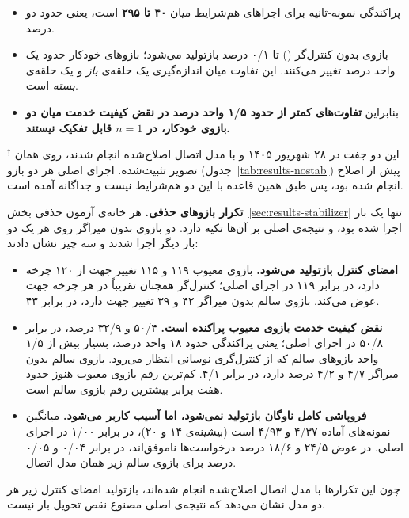 \begin{itemize}
  \item پراکندگی نمونه-ثانیه برای اجراهای هم‌شرایط میان \textbf{۴۰ تا ۲۹۵} است، یعنی حدود دو
  درصد.
  \item بازوی بدون کنترل‌گر () تا ۰/۱ درصد بازتولید می‌شود؛ بازوهای خودکار حدود
  یک واحد درصد تغییر می‌کنند. این تفاوت میان اندازه‌گیری یک حلقه‌ی \emph{باز} و یک حلقه‌ی
  \emph{بسته} است.
  \item بنابراین \textbf{تفاوت‌های کمتر از حدود ۱/۵ واحد درصد در نقض کیفیت خدمت میان دو بازوی
  خودکار، در $n=1$ قابل تفکیک نیستند.}
\end{itemize}

\noindent$^{\ddagger}$ این دو جفت در ۲۸ شهریور ۱۴۰۵ و با مدل اتصال اصلاح‌شده انجام شدند، روی
همان تصویر تثبیت‌شده. اجرای اصلی هر دو بازو (جدول~\ref{tab:results-nostab}) پیش از اصلاح انجام
شده بود، پس طبق همین قاعده با این دو هم‌شرایط نیست و جداگانه آمده است.

\textbf{تکرار بازوهای حذفی.} هر خانه‌ی آزمون حذفی بخش~\ref{sec:results-stabilizer} تنها یک بار
اجرا شده بود، و نتیجه‌ی اصلی بر آن‌ها تکیه دارد. دو بازوی بدون میراگر روی  هر یک دو
بار دیگر اجرا شدند و سه چیز نشان دادند:

\begin{itemize}
  \item \textbf{امضای کنترل بازتولید می‌شود.} بازوی معیوب ۱۱۹ و ۱۱۵ تغییر جهت از ۱۲۰ چرخه دارد، در
  برابر ۱۱۹ در اجرای اصلی؛ کنترل‌گر همچنان تقریباً در هر چرخه جهت عوض می‌کند. بازوی سالم بدون
  میراگر ۴۲ و ۳۹ تغییر جهت دارد، در برابر ۴۳.
  \item \textbf{نقض کیفیت خدمت بازوی معیوب پراکنده است.} ۵۰/۴ و ۳۲/۹ درصد، در برابر ۵۰/۸ در اجرای
  اصلی؛ یعنی پراکندگی حدود ۱۸ واحد درصد، بسیار بیش از ۱/۵ واحد بازوهای سالم \mdash{} که از
  کنترل‌گری نوسانی انتظار می‌رود. بازوی سالم بدون میراگر ۴/۷ و ۴/۲ درصد دارد، در برابر
  ۴/۱. کم‌ترین رقم بازوی معیوب هنوز حدود هفت برابر بیشترین رقم بازوی سالم است.
  \item \textbf{فروپاشی کامل ناوگان بازتولید نمی‌شود، اما آسیب کاربر می‌شود.} میانگین نمونه‌های
  آماده ۴/۳۷ و ۴/۹۳ است (بیشینه‌ی ۱۴ و ۲۰)، در برابر ۱/۰۰ در اجرای اصلی. در عوض ۲۴/۵ و ۱۸/۶ درصد
  درخواست‌ها ناموفق‌اند، در برابر ۰/۰۴ و ۰/۰۵ درصد برای بازوی سالم زیر همان مدل اتصال.
\end{itemize}

چون این تکرارها با مدل اتصال اصلاح‌شده انجام شده‌اند، بازتولید امضای کنترل زیر هر دو مدل نشان
می‌دهد که نتیجه‌ی اصلی مصنوع نقص تحویل بار نیست.

